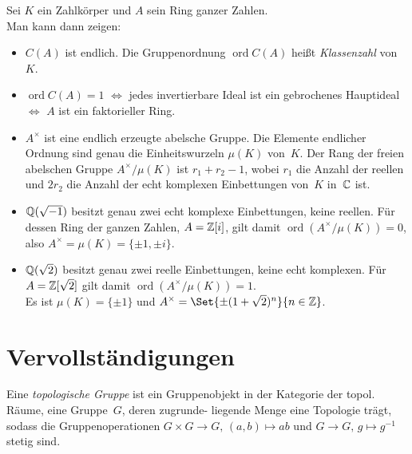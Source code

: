 \documentclass{cheat-sheet}
\DeclareMathOperator{\ord}{ord} %
\begin{document}
\begin{bem}
  Sei $K$ ein Zahlkörper und $A$ sein Ring ganzer Zahlen. \\
  Man kann dann zeigen:
  \begin{itemize}
    \item $C(A)$ ist endlich.
    Die Gruppenordnung $\ord C(A)$ heißt \textit{Klassenzahl} von $K$.
    \item $\ord C(A) = 1$ $\iff$ jedes invertierbare Ideal ist ein gebrochenes Hauptideal $\iff$ $A$ ist ein faktorieller Ring.
    \item $A^{\times}$ ist eine endlich erzeugte abelsche Gruppe.
    Die Elemente endlicher Ordnung sind genau die Einheitswurzeln $\mu(K)$ von~$K$.
    Der Rang der freien abelschen Gruppe $A^{\times} / \mu(K)$ ist $r_1 + r_2 - 1$, wobei $r_1$ die Anzahl der reellen und $2 r_2$ die Anzahl der echt komplexen Einbettungen von~$K$ in~$\mathbb{C}$ ist.
  \end{itemize}
\end{bem}

\begin{bspe}
  \begin{itemize}
    \item $\mathbb{Q}(\sqrt{-1})$ besitzt genau zwei echt komplexe Einbettungen, keine reellen.
    Für dessen Ring der ganzen Zahlen, $A = \mathbb{Z}[i]$, gilt damit $\ord(A^{\times} / \mu(K)) = 0$, also $A^{\times} = \mu(K) = \{ \pm 1, \pm i \}$.
    \item $\mathbb{Q}(\sqrt{2})$ besitzt genau zwei reelle Einbettungen, keine echt komplexen.
    Für $A = \mathbb{Z}[\sqrt{2}]$ gilt damit $\ord(A^{\times} / \mu(K)) = 1$. \\
    Es ist $\mu(K) = \{ \pm 1 \}$ und $A^{\times} = \Set{\pm (1 + \sqrt{2})^n}{n \in \Z}$.
  \end{itemize}
\end{bspe}

\section{Vervollständigungen}



\begin{defn}
  Eine \emph{topologische Gruppe} ist ein Gruppenobjekt in der Kategorie der topol. Räume, \dh{} eine Gruppe~$G$, deren zugrunde- liegende Menge eine Topologie trägt, sodass die Gruppenoperationen $G \times G \to G, \, (a, b) \mapsto ab$ und $G \to G, \, g \mapsto g^{-1}$ stetig sind.
\end{defn}
\end{document}
